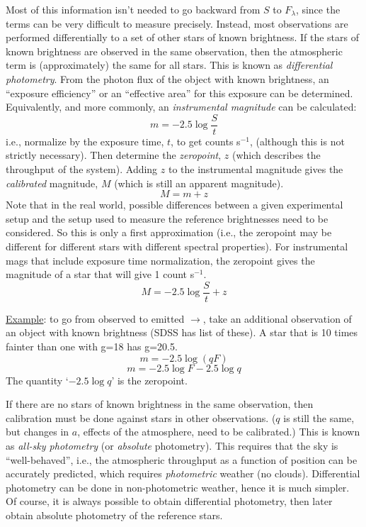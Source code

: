 \documentclass[12pt]{article}
\newcommand{\mynotes}[1]{\textcolor{myBlue}{#1}}
\begin{document}
Most of this information isn't needed to go backward from $S$ to $F_{\lambda}$,
since the terms can be very difficult to measure precisely. Instead, most
observations are performed differentially to a set of other stars of known
brightness. If the stars of known brightness are observed in the same
observation, then the atmospheric term is (approximately) the same for all
stars. This is known as \textit{differential photometry}. From the photon flux
of the object with known brightness, an ``exposure efficiency'' or an
``effective area'' for this exposure can be determined. Equivalently, and more
commonly, an \textit{instrumental magnitude} can be calculated:
\[
    m = -2.5 \log \frac{S}{t}
    \]
i.e., normalize by the exposure time, $t$, to get counts s$^{-1}$, (although
this is not strictly necessary). Then determine the \textit{zeropoint}, $z$
\mynotes{(which describes the throughput of the system)}. Adding $z$ to the
instrumental magnitude gives the \textit{calibrated} magnitude, $M$ (which is
still an apparent magnitude).
\[
    M = m + z
    \]
Note that in the real world, possible
differences between a given experimental setup and the setup used to
measure the reference brightnesses need to be considered.
So this is only a first
approximation (i.e., the zeropoint may be different for different
stars with different spectral properties). For instrumental mags
that include exposure time normalization, the zeropoint gives the
magnitude of a star that will give 1 count s$^{-1}$.
\[
    M = -2.5\log\frac{S}{t} + z
    \]
\begin{framed}
    \underline{Example}: to go from observed to emitted $\rightarrow$,
    take an additional observation of an object with known brightness
    (SDSS has list of these).
    A star that is 10 times fainter than one with g=18 has g=20.5.
    \[
        m = -2.5 \log(qF)
        \]
    \[
        m = -2.5 \log F - 2.5\log q 
        \]
    The quantity `$-2.5\log q$' is the zeropoint.
\end{framed}
If there are no stars of known brightness in the same observation, then
calibration must be done against stars in other observations. \mynotes{($q$ is
still the same, but changes in $a$, effects of the atmosphere, need to be
calibrated.)} This is known as \textit{all-sky photometry} (or
\textit{absolute} photometry). This requires that the sky is ``well-behaved'',
i.e., the atmospheric throughput as a function of position can be accurately
predicted, which requires \textit{photometric} weather (no clouds).
Differential photometry can be done in non-photometric weather, hence it is
much simpler. Of course, it is always possible to obtain differential
photometry, then later obtain absolute photometry of the reference stars.
\end{document}
